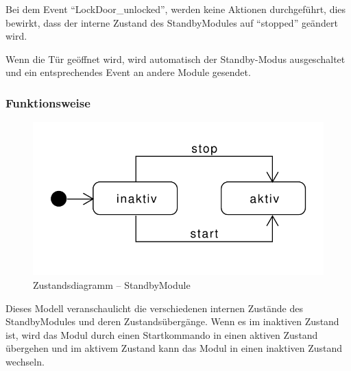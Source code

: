 Bei dem Event "`LockDoor\_unlocked"', werden keine Aktionen durchgeführt, dies bewirkt, dass der interne Zustand des StandbyModules auf "`stopped"' geändert wird.

Wenn die Tür geöffnet wird, wird automatisch der Standby-Modus ausgeschaltet und ein entsprechendes Event an andere Module gesendet.

\subsubsection{Funktionsweise}

\begin{figure}[h!]
	\centering
	\includegraphics[scale=0.7]{img/Modulkonzeption/StandbyStateMachine.pdf}
	\caption{Zustandsdiagramm – StandbyModule}
	\label{fig:standbyStateMachine}
\end{figure}


Dieses Modell veranschaulicht die verschiedenen internen Zustände des StandbyModules und deren Zustandsübergänge. Wenn es im inaktiven Zustand ist, wird das Modul durch einen Startkommando in einen aktiven Zustand übergehen und im aktivem Zustand kann das Modul in einen inaktiven Zustand wechseln.

